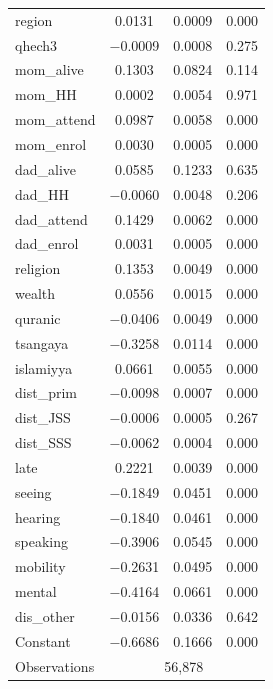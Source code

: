 \begin{landscape}
\begin{table}[H]
\begin{threeparttable}
\begin{tabular}{lccc}
            region          & 0.0131  & 0.0009 & 0.000 \\
            qhech3          & $-$0.0009 & 0.0008 & 0.275 \\
            mom\_alive      & 0.1303  & 0.0824 & 0.114 \\
            mom\_HH         & 0.0002  & 0.0054 & 0.971 \\
            mom\_attend     & 0.0987  & 0.0058 & 0.000 \\
            mom\_enrol      & 0.0030  & 0.0005 & 0.000 \\
            dad\_alive      & 0.0585  & 0.1233 & 0.635 \\
            dad\_HH         & $-$0.0060 & 0.0048 & 0.206 \\
            dad\_attend     & 0.1429  & 0.0062 & 0.000 \\
            dad\_enrol      & 0.0031  & 0.0005 & 0.000 \\
            religion        & 0.1353  & 0.0049 & 0.000 \\
            wealth          & 0.0556  & 0.0015 & 0.000 \\
            quranic         & $-$0.0406 & 0.0049 & 0.000 \\
            tsangaya        & $-$0.3258 & 0.0114 & 0.000 \\
            islamiyya       & 0.0661  & 0.0055 & 0.000 \\
            dist\_prim      & $-$0.0098 & 0.0007 & 0.000 \\
            dist\_JSS       & $-$0.0006 & 0.0005 & 0.267 \\
            dist\_SSS       & $-$0.0062 & 0.0004 & 0.000 \\
            late            & 0.2221  & 0.0039 & 0.000 \\
            seeing          & $-$0.1849 & 0.0451 & 0.000 \\
            hearing         & $-$0.1840 & 0.0461 & 0.000 \\
            speaking        & $-$0.3906 & 0.0545 & 0.000 \\
            mobility        & $-$0.2631 & 0.0495 & 0.000 \\
            mental          & $-$0.4164 & 0.0661 & 0.000 \\
            dis\_other      & $-$0.0156 & 0.0336 & 0.642 \\
            Constant        & $-$0.6686 & 0.1666 & 0.000 \\
            \midrule
            Observations    & \multicolumn{3}{c}{56,878} \\

\end{tabular}
\end{threeparttable}
\end{table}
\end{landscape}
